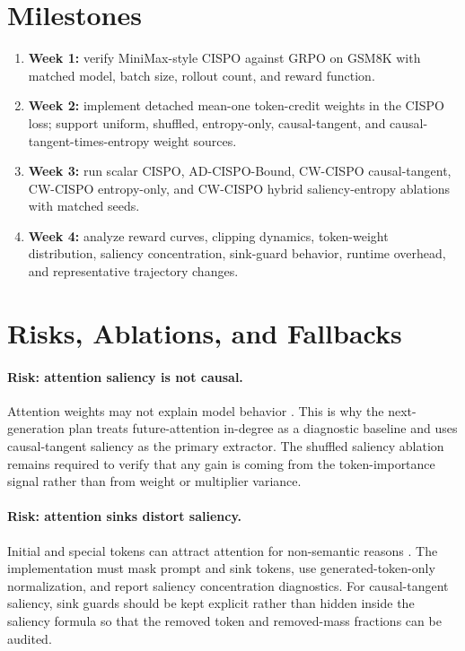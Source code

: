 \documentclass[11pt]{article}
\begin{document}
\section{Milestones}

\begin{enumerate}[leftmargin=*]
  \item \textbf{Week 1:} verify MiniMax-style CISPO against GRPO on GSM8K with
  matched model, batch size, rollout count, and reward function.
  \item \textbf{Week 2:} implement detached mean-one token-credit weights in
  the CISPO loss; support uniform, shuffled, entropy-only, causal-tangent, and
  causal-tangent-times-entropy weight sources.
  \item \textbf{Week 3:} run scalar CISPO, AD-CISPO-Bound, CW-CISPO
  causal-tangent, CW-CISPO entropy-only, and CW-CISPO hybrid saliency-entropy
  ablations with matched seeds.
  \item \textbf{Week 4:} analyze reward curves, clipping dynamics, token-weight
  distribution, saliency concentration, sink-guard behavior, runtime overhead,
  and representative trajectory changes.
\end{enumerate}

\section{Risks, Ablations, and Fallbacks}

\paragraph{Risk: attention saliency is not causal.}
Attention weights may not explain model behavior \cite{jain2019attention}.
This is why the next-generation plan treats future-attention in-degree as a
diagnostic baseline and uses causal-tangent saliency as the primary extractor.
The shuffled saliency ablation remains required to verify that any gain is
coming from the token-importance signal rather than from weight or multiplier
variance.

\paragraph{Risk: attention sinks distort saliency.}
Initial and special tokens can attract attention for non-semantic reasons
\cite{xiao2024streamingllm}. The implementation must mask prompt and sink
tokens, use generated-token-only normalization, and report saliency
concentration diagnostics. For causal-tangent saliency, sink guards should be
kept explicit rather than hidden inside the saliency formula so that the removed
token and removed-mass fractions can be audited.
\end{document}
